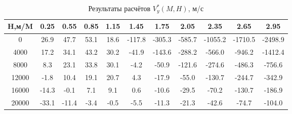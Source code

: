 \begin{table}[H]
\centering
\caption{Результаты расчётов $V^*_y(M,H)$, м/с}
\label{Vy}
\begin{tabular}{|c|c|c|c|c|c|c|c|c|c|c|}
\toprule
H,м/M &  0.25 &  0.55 &  0.85 &  1.15 &   1.45 &   1.75 &   2.05 &    2.35 &    2.65 &    2.95 \\
\midrule
0     &  26.9 &  47.7 &  53.1 &  18.6 & -117.8 & -305.3 & -585.7 & -1055.2 & -1710.5 & -2498.9 \\
4000  &  17.2 &  34.1 &  43.2 &  30.2 &  -41.9 & -143.6 & -288.2 &  -566.0 &  -946.2 & -1412.4 \\
8000  &   8.3 &  23.1 &  33.8 &  30.1 &   -4.2 &  -50.9 & -121.6 &  -274.6 &  -486.3 &  -756.6 \\
12000 &  -1.8 &  10.4 &  19.1 &  20.7 &    4.3 &  -17.9 &  -55.0 &  -130.7 &  -244.7 &  -342.9 \\
16000 & -14.3 &  -0.1 &   7.1 &   9.1 &    0.6 &  -10.6 &  -29.5 &   -70.2 &  -130.7 &  -186.9 \\
20000 & -33.1 & -11.4 &  -3.4 &  -0.5 &   -5.5 &  -11.3 &  -21.3 &   -42.6 &   -74.7 &  -104.0 \\
\bottomrule
\end{tabular}
\end{table}
